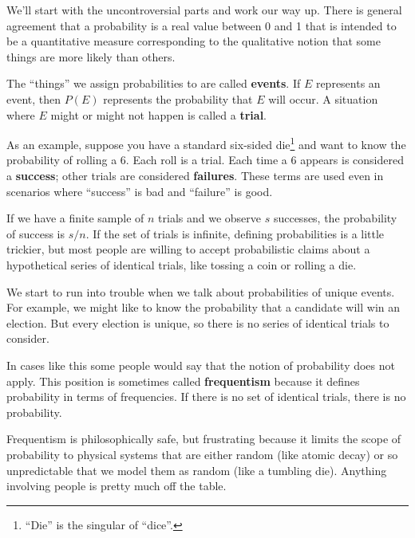 \documentclass[12pt]{book}
\begin{document}
We'll start with the uncontroversial parts and work our way up.  There
is general agreement that a probability is a real value between 0 and
1 that is intended to be a quantitative measure corresponding to the
qualitative notion that some things are more likely than others.


The ``things'' we assign probabilities to are called {\bf events}.  If
$E$ represents an event, then $P(E)$ represents the probability that
$E$ will occur.  A situation where $E$ might or might not happen is
called a {\bf trial}.


As an example, suppose you have a standard six-sided
die\footnote{``Die'' is the singular of ``dice''.} and want to know
the probability of rolling a 6.  Each roll is a trial.
Each time a 6 appears is considered a {\bf success}; other trials are
considered {\bf failures}.  These terms are used even in scenarios
where ``success'' is bad and ``failure'' is good.

If we have a finite sample of $n$ trials and we observe $s$ successes,
the probability of success is $s/n$.  If the set of trials is
infinite, defining probabilities is a little trickier, but most people
are willing to accept probabilistic claims about a hypothetical series
of identical trials, like tossing a coin or rolling a die.


We start to run into trouble when we talk about probabilities of
unique events.  For example, we might like to know the probability
that a candidate will win an election.  But every election is unique,
so there is no series of identical trials to consider.


In cases like this some people would say that the notion of
probability does not apply.  This position is sometimes called {\bf
  frequentism} because it defines probability in terms of frequencies.
If there is no set of identical trials, there is no probability.


Frequentism is philosophically safe, but
frustrating because it limits the scope of probability to physical
systems that are either random (like atomic decay) or so unpredictable
that we model them as random (like a tumbling die).  Anything involving
people is pretty much off the table.
\end{document}
